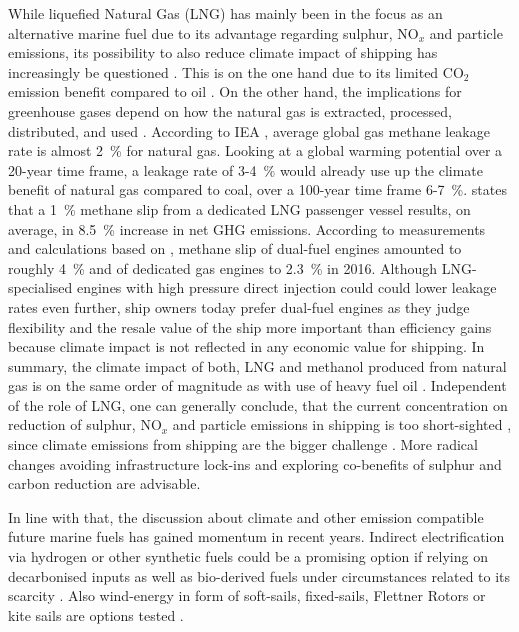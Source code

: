 \documentclass[article]{elsarticle}
\begin{document}
While liquefied Natural Gas (LNG) has mainly been in the focus as an alternative marine fuel \cite{IMO2016a,DNVGL2015} due to its advantage regarding sulphur, NO$_x$ and particle emissions, its possibility to also reduce climate impact of shipping has increasingly be questioned \cite{BRYNOLF2014b}. This is on the one hand due to its limited CO$_2$ emission benefit compared to oil \cite{DNVGL2014}. On the other hand, the implications for greenhouse gases depend on how the natural gas is extracted, processed, distributed, and used \cite{THOMSON2015}. According to IEA \cite{IEA2017}, average global gas methane leakage rate is almost 2~\% for natural gas. Looking at a global warming potential over a 20-year time frame, a leakage rate of 3-4~\% would already use up the climate benefit of natural gas compared to coal, over a 100-year time frame 6-7~\%. \citep{Hagos2018} states that a 1~\% methane slip from a dedicated LNG passenger vessel results, on average, in 8.5~\% increase in net GHG emissions. According to measurements and calculations based on \cite{Corbett2015,Stenersen2017}, methane slip of dual-fuel engines amounted to roughly 4~\% and of dedicated gas engines to 2.3~\% in 2016. Although LNG-specialised engines with high pressure direct injection could could lower leakage rates even further, ship owners today prefer dual-fuel engines as they judge flexibility and the resale value of the ship more important than efficiency gains because climate impact is not reflected in any economic value for shipping. 
In summary, the climate impact of both, LNG and methanol produced from natural gas is on the same order of magnitude as with use of heavy fuel oil \cite{BRYNOLF2014,DNVGL2018}. 
Independent of the role of LNG, one can generally conclude, that the current concentration on reduction of sulphur, NO$_x$ and particle emissions in shipping is too short-sighted \cite{Gilbert2014}, since climate emissions from shipping are the bigger challenge \cite{FRIDELL2019}. More radical changes avoiding infrastructure lock-ins and exploring co-benefits of sulphur and carbon reduction are advisable.

In line with that, the discussion about climate and other emission compatible future marine fuels has gained momentum in recent years. Indirect electrification via hydrogen or other synthetic fuels could be a promising option \cite{HORVATH2018} if relying on decarbonised inputs as well as bio-derived fuels under circumstances related to its scarcity \cite{Gilbert2014}. Also wind-energy in form of soft-sails, fixed-sails, Flettner Rotors or kite sails are options tested \cite{IRENA2015}.
\end{document}
